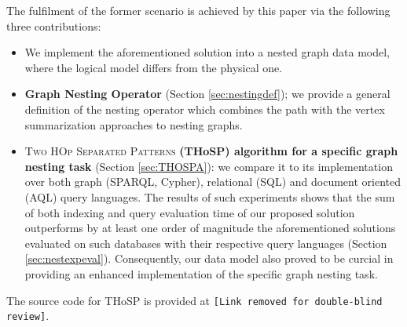 The fulfilment of the former scenario is achieved by this paper via the following three contributions:

\begin{itemize}
	\item We implement the aforementioned solution into a nested graph data model, where the logical model differs from the physical one.
	\item \textbf{Graph Nesting Operator} (Section \ref{sec:nestingdef}); we provide a general definition of the nesting operator which combines the path  with the vertex summarization approaches to nesting graphs.
	\item \textsc{{Two HOp Separated Patterns}} \textbf{(THoSP) algorithm for a specific graph nesting task} (Section \ref{sec:THOSPA}): we
	compare it to its implementation
	over both graph  (SPARQL, Cypher), relational (SQL) and document oriented (AQL) query languages. The results of such experiments shows that the sum of both indexing and query evaluation time of our proposed solution outperforms by at least one order of magnitude the aforementioned solutions evaluated on such databases with their respective query languages (Section \ref{sec:nestexpeval}). Consequently, our data model also proved to be curcial in providing an enhanced implementation of the specific graph nesting task.
\end{itemize}

The source code for THoSP is provided at \texttt{\color{red}[Link removed for double-blind review]}.
